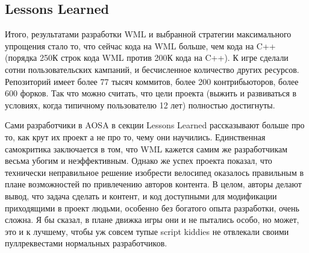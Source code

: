 \documentclass[a5paper]{article}
\begin{document}
\subsection{Lessons Learned}

Итого, результатами разработки WML и выбранной стратегии максимального упрощения стало то, что сейчас кода на WML больше, чем кода на C++ (порядка 250К строк кода WML против 200К кода на C++). К игре сделали сотни пользовательских кампаний, и бесчисленное количество других ресурсов. Репозиторий имеет более 77 тысяч коммитов, более 200 контрибьюторов, более 600 форков. Так что можно считать, что цели проекта (выжить и развиваться в условиях, когда типичному пользователю 12 лет) полностью достигнуты. 

Сами разработчики в AOSA в секции Lessons Learned рассказывают больше про то, как крут их проект а не про то, чему они научились. Единственная самокритика заключается в том, что WML кажется самим же разработчикам весьма убогим и неэффективным. Однако же успех проекта показал, что технически неправильное решение изобрести велосипед оказалось правильным в плане возможностей по привлечению авторов контента. В целом, авторы делают вывод, что задача сделать и контент, и код доступными для модификации приходящими в проект людьми, особенно без богатого опыта разработки, очень сложна. Я бы сказал, в плане движка игры они и не пытались особо, но может, это и к лучшему, чтобы уж совсем тупые script kiddies не отвлекали своими пуллреквестами нормальных разработчиков.
\end{document}
